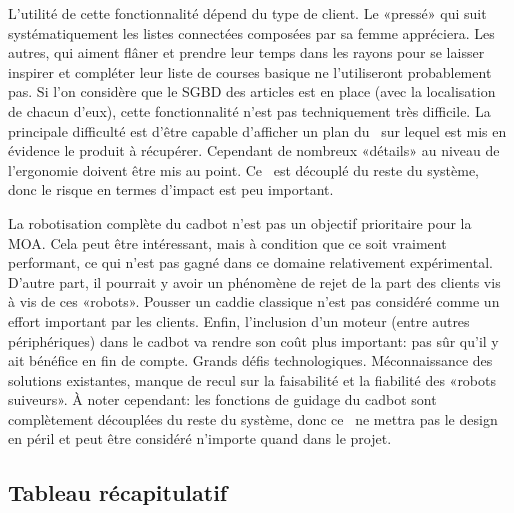 \startnote
{} L'utilité de cette fonctionnalité dépend du type de client.
Le «pressé» qui suit systématiquement les listes connectées composées par sa femme appréciera.
Les autres, qui aiment flâner et prendre leur temps dans les rayons pour se laisser inspirer et compléter leur liste de courses basique ne l'utiliseront probablement pas.
Si l'on considère que le SGBD des articles est en place (avec la localisation de chacun d'eux), cette fonctionnalité n'est pas techniquement très difficile.
La principale difficulté est d'être capable d'afficher un plan du \fm\ sur lequel est mis en évidence le produit à récupérer.
Cependant de nombreux «détails» au niveau de l'ergonomie doivent être mis au point.
Ce \cu\ est découplé du reste du système, donc le risque en termes d'impact est peu important.
\stopnote

\startnote
{} La robotisation complète du cadbot n'est pas un objectif prioritaire pour la MOA.
Cela peut être intéressant, mais à condition que ce soit vraiment performant, ce qui n'est pas gagné dans ce domaine relativement expérimental. 
D'autre part, il pourrait y avoir un phénomène de rejet de la part des clients vis à vis de ces «robots».
Pousser un caddie classique n'est pas considéré comme un effort important par les clients.
Enfin, l'inclusion d'un moteur (entre autres périphériques) dans le cadbot va rendre son coût plus important: pas sûr qu'il y ait bénéfice en fin de compte.
 Grands défis technologiques. Méconnaissance des solutions existantes, manque de recul sur la faisabilité et la fiabilité des «robots suiveurs». 
À noter cependant: les fonctions de guidage du cadbot sont complètement découplées du reste du système, donc ce \cu\ ne mettra pas le design en péril et peut être considéré n'importe quand dans le projet.
\stopnote

\iffalse
\descCU{RécupérationCadBotEnPanne}
\TODO\ Ce CU est trop vague et trop peu discuté pour le moment, de plus il concerne le personnel et non le client.
\startnote
\NC4 Si la fonctionnalité CadBot est implémentée, il sera intéressant de suivre les anomalies et la localisation des cadBots. Cela implique logistique particulière pour le gestionnaire du magasin.
\NR3 Les technologies utilisées sont maîtrisées (wifi, gps, guidage) mais le risque est lié au soin que pourraient apporter les clients dans l'utilisation de cadBots et à la fiabilité du matériel stocké en extérieur.
\stopnote
\fi


\subsection{Tableau récapitulatif}

